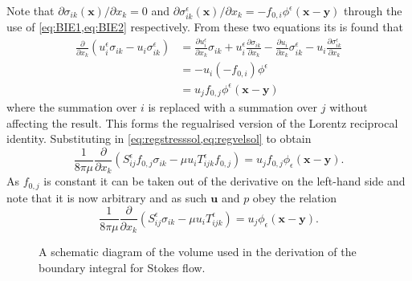 Note that $\partial \sigma_{ik}(\bm{x})/ \partial x_k = 0$ and $\partial \sigma^\epsilon_{ik}(\bm{x})/ \partial x_k = -f_{0,i}\phi^\epsilon(\bm{x}-\bm{y})$ through the use of \cref{eq:BIE1,eq:BIE2} respectively. From these two equations its is found that
\begin{equation*}
\begin{aligned}
  \frac{\partial}{\partial x_k}(u^\epsilon_i\sigma_{ik} - u_i\sigma^\epsilon_{ik}) &=
  \frac{\partial u^\epsilon_i}{\partial x_k} \sigma_{ik} + u^\epsilon_i\frac{\partial \sigma_{ik}}{\partial x_k} - \frac{\partial u_i}{\partial x_k} \sigma^\epsilon_{ik} - u_i\frac{\partial \sigma^\epsilon_{ik}}{\partial x_k}  \\
  & = - u_i(-f_{0,i})\phi^\epsilon  \\
  &= u_j f_{0,j}\phi^\epsilon(\bm{x}-\bm{y})
\end{aligned}
\end{equation*}
where the summation over $i$ is replaced with a summation over $j$ without affecting the result. This forms the regualrised version of the Lorentz reciprocal identity. Substituting in \cref{eq:regstresssol,eq:regvelsol} to obtain
\begin{equation*}
  \frac{1}{8\pi\mu}\frac{\partial}{\partial x_k}(S^\epsilon_{ij}f_{0,j}\sigma_{ik} - \mu u_i T^\epsilon_{ijk}f_{0,j}) = u_j f_{0,j}\phi_\epsilon(\bm{x}-\bm{y}).
\end{equation*}
As $f_{0,j}$ is constant it can be taken out of the derivative on the left-hand side and note that it is now arbitrary and as such $\bm{u}$ and $p$ obey the relation
\begin{equation}
  \label{eq:reciprocalrelation}
  \frac{1}{8\pi\mu}\frac{\partial}{\partial x_k}(S^\epsilon_{ij}\sigma_{ik} - \mu u_i T^\epsilon_{ijk}) = u_j\phi_\epsilon(\bm{x}-\bm{y}).
\end{equation}

\begin{figure}
    \centering
    \resizebox{.4\linewidth}{!}{}
    \caption{A schematic diagram of the volume used in the derivation of the boundary integral for Stokes flow.}
    \label{fig:SystematicDiagram}
\end{figure}

